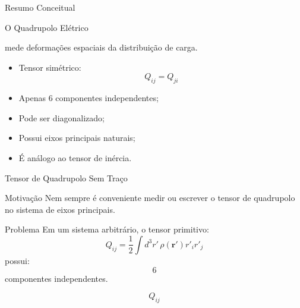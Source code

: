 \documentclass[aspectratio=169]{beamer}
\begin{document}
\begin{frame}{Resumo Conceitual}

\begin{center}

\Huge
O Quadrupolo Elétrico

\vspace{0.4cm}

mede deformações espaciais da distribuição de carga.

\end{center}

\vspace{0.5cm}

\begin{itemize}
\item Tensor simétrico:
\[
Q_{ij}=Q_{ji}
\]

\item Apenas 6 componentes independentes;

\item Pode ser diagonalizado;

\item Possui eixos principais naturais;

\item É análogo ao tensor de inércia.
\end{itemize}

\end{frame}




\begin{frame}{Tensor de Quadrupolo Sem Traço}

\begin{mybox}{Motivação}
Nem sempre é conveniente medir ou escrever o tensor de quadrupolo no sistema de eixos principais.
\end{mybox}

\vspace{0.3cm}

\begin{alertblock}{Problema}
Em um sistema arbitrário, o tensor primitivo:
\[
Q_{ij}
=
\frac12
\int d^3r'\,
\rho(\mathbf r')r'_i r'_j
\]
possui:
\[
6
\]
componentes independentes.
\end{alertblock}

\vspace{0.3cm}

\begin{center}
\Large
\[
Q_{ij}
\]
\end{center}

\end{frame}
\end{document}
